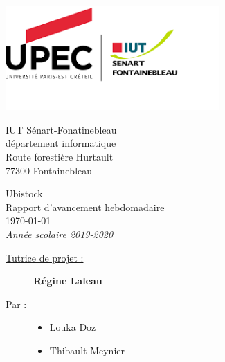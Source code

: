 \documentclass[a4paper, 12pt]{report}
\title{}
\author{
	Louka Doz
	\and 
	Thibault Meynier
}
\date{\raggedleft \today}
\begin{document}
	\makeatletter
	\begin{titlepage}

		\begin{flushleft}
			\begin{minipage}{4cm}
				\includegraphics[height=4cm]{img/logo_iut}
			\end{minipage}
			\hfill
			\begin{minipage}{5cm}
				\begin{flushright}
		        	\small IUT Sénart-Fonatinebleau\\
		        	département informatique\\
		        	Route forestière Hurtault\\
		        	77300 Fontainebleau\\
				\end{flushright}
			\end{minipage}
		\end{flushleft}

		\vfill

		\begin{center}
	        \vspace*{3cm}%
	        {\HUGE Ubistock}\\[0.5cm]
	        {\huge Rapport d'avancement hebdomadaire}\\[0.5cm]
	        {\Large \today}\\[0.5cm]
        	{\large \textit{Année scolaire 2019-2020}}\\[1cm]
	    \end{center}
	    \vfill
        \begin{raggedright}
	        \begin{description}
	        	\item[\large \underline{Tutrice de projet :}] \large \textbf{Régine Laleau}\\[1cm]
	        	\item[\underline{Par :}] 
		        	\begin{itemize}
			        		\item Louka Doz
			        		\item Thibault Meynier
			        \end{itemize}
	        \end{description}
        \end{raggedright}        
	    \let\newpage\relax%
	\end{titlepage}
	\makeatother
\end{document}
